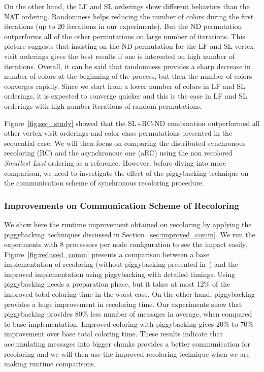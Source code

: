 \documentclass{article}
\begin{document}
On the other hand, the LF and SL orderings show different behaviors
than the NAT ordering. Randomness helps reducing the number of colors during
the first iterations (up to 20 iterations in our experiments). But the
ND permutation outperforms all of the other permutations on large number of
iterations.  This picture suggests that insisting on the ND permutation
for the LF and SL vertex-visit orderings gives the best results if one is
interested on high number of iterations. Overall, it can be said that randomness
provides a sharp decrease in number of colors at the beginning of the process, but then the number of colors converges 
rapidly. Since we start from a lower number of colors in LF and SL orderings,
it is expected to converge quicker and this is the case in LF and SL orderings
with high number iterations of random permutations.

Figure~\ref{fig:seq_study} showed that the SL+RC-ND combination
outperformed all other vertex-visit orderings and color class
permutations presented in the sequential case. We will then focus on
comparing the distributed synchronous recoloring (RC) and the
asynchronous one (aRC) using the non recolored {\em Smallest Last} ordering
as a reference. However, before diving into more comparison, we
need to investigate the effect of the piggybacking technique on the
communication scheme of synchronous recoloring procedure.

\subsubsection{Improvements on Communication Scheme of Recoloring}
\label{sec:improved_comm_exp}


We show here the runtime improvement obtained on recoloring by applying the piggybacking\
techniques discussed in Section~\ref{sec:improved_comm}. We run the experiments with 8 processors per node 
configuration to see the impact easily. Figure~\ref{fig:reduced_comm} presents
a comparison between a base implementation of recoloring (without piggybacking presented in~\cite{HiPC11})
and the improved implementation using piggybacking
with detailed timings. Using piggybacking needs a preparation phase, but it takes at most 12\%
of the improved total coloring time in the worst case. On the other hand, piggybacking provides
a huge improvement in recoloring time. Our experiments show that piggybacking provides
80\% less number of messages in average, when compared to base implementation. Improved coloring with piggybacking gives 20\% to 70\% improvement over base total
coloring time. These results indicate that accumulating messages into bigger chunks provides a
better communication for recoloring and we will then use the 
improved recoloring technique when we are making
runtime comparisons.
\end{document}
